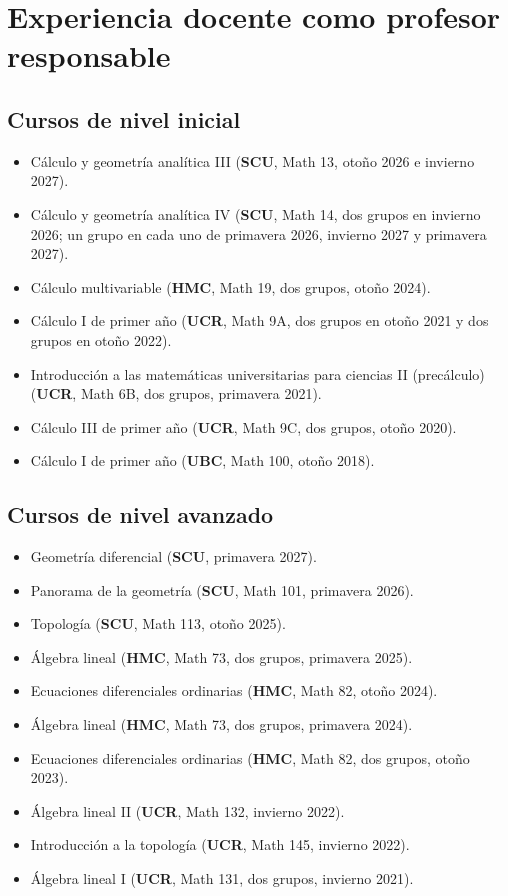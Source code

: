 \documentclass[11pt]{article}
\begin{document}
\section{Experiencia docente como profesor responsable}

\subsection*{Cursos de nivel inicial}
\begin{itemize}
  \item Cálculo y geometría analítica III (\textbf{SCU}, Math 13, otoño 2026 e invierno 2027).
  \item Cálculo y geometría analítica IV (\textbf{SCU}, Math 14, dos grupos en invierno 2026; un grupo en cada uno de primavera 2026, invierno 2027 y primavera 2027).
  \item Cálculo multivariable (\textbf{HMC}, Math 19, dos grupos, otoño 2024).
  \item Cálculo I de primer año (\textbf{UCR}, Math 9A, dos grupos en otoño 2021 y dos grupos en otoño 2022).
  \item Introducción a las matemáticas universitarias para ciencias II (precálculo) (\textbf{UCR}, Math 6B, dos grupos, primavera 2021).
  \item Cálculo III de primer año (\textbf{UCR}, Math 9C, dos grupos, otoño 2020).
  \item Cálculo I de primer año (\textbf{UBC}, Math 100, otoño 2018).
\end{itemize}

\subsection*{Cursos de nivel avanzado}
\begin{itemize}
  \item Geometría diferencial (\textbf{SCU}, primavera 2027).
  \item Panorama de la geometría (\textbf{SCU}, Math 101, primavera 2026).
  \item Topología (\textbf{SCU}, Math 113, otoño 2025).
  \item Álgebra lineal (\textbf{HMC}, Math 73, dos grupos, primavera 2025).
  \item Ecuaciones diferenciales ordinarias (\textbf{HMC}, Math 82, otoño 2024).
  \item Álgebra lineal (\textbf{HMC}, Math 73, dos grupos, primavera 2024).
  \item Ecuaciones diferenciales ordinarias (\textbf{HMC}, Math 82, dos grupos, otoño 2023).
  \item Álgebra lineal II (\textbf{UCR}, Math 132, invierno 2022).
  \item Introducción a la topología (\textbf{UCR}, Math 145, invierno 2022).
  \item Álgebra lineal I (\textbf{UCR}, Math 131, dos grupos, invierno 2021).
\end{itemize}
\end{document}
